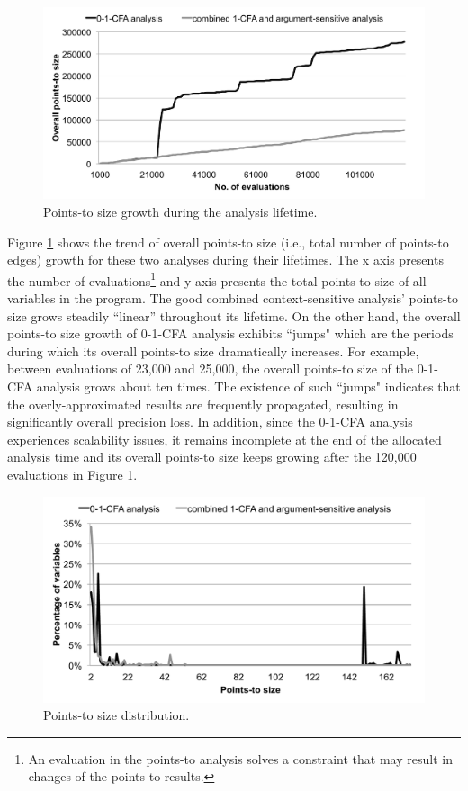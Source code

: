 \begin{figure}[th!]
        \includegraphics[width=\columnwidth]{pts-growth}
\caption{\textmd{Points-to size growth during the analysis lifetime.}}
\label{fig:pts-growth}
\end{figure}

Figure \ref{fig:pts-growth} shows the trend of overall points-to size (i.e., total number of points-to edges) growth for these two analyses during their lifetimes. The x axis presents the number of evaluations\footnote{An evaluation in the points-to analysis solves a constraint that may result in changes of the points-to results.} and y axis presents the total points-to size of all variables in the program. The good combined context-sensitive analysis' points-to size grows steadily ``linear'' throughout its lifetime. On the other hand, the overall points-to size growth of 0-1-CFA analysis exhibits ``jumps" which are the periods during which its overall points-to size dramatically increases. For example, between evaluations of 23,000 and 25,000, the overall points-to size of the 0-1-CFA analysis grows about ten times. The existence of such ``jumps" indicates that the overly-approximated results are frequently propagated, resulting in significantly overall precision loss. In addition, since the 0-1-CFA analysis experiences scalability issues, it remains incomplete at the end of the allocated analysis time and its overall points-to size keeps growing after the 120,000 evaluations in Figure \ref{fig:pts-growth}.

\begin{figure}[th!]
        \includegraphics[width=\columnwidth]{pts-distribution}
\caption{\textmd{Points-to size distribution.}}
\label{fig:pts-distribution}
\end{figure}

